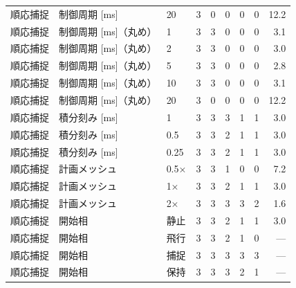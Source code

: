 \begin{tabular}{lllrrrrrr}
順応捕捉 & 制御周期 [ms] & 20 & 3 & 0 & 0 & 0 & 0 & 12.2 \\
順応捕捉 & 制御周期 [ms]（丸め） & 1 & 3 & 3 & 0 & 0 & 0 & 3.1 \\
順応捕捉 & 制御周期 [ms]（丸め） & 2 & 3 & 3 & 0 & 0 & 0 & 3.0 \\
順応捕捉 & 制御周期 [ms]（丸め） & 5 & 3 & 3 & 0 & 0 & 0 & 2.8 \\
順応捕捉 & 制御周期 [ms]（丸め） & 10 & 3 & 3 & 0 & 0 & 0 & 3.1 \\
順応捕捉 & 制御周期 [ms]（丸め） & 20 & 3 & 0 & 0 & 0 & 0 & 12.2 \\
順応捕捉 & 積分刻み [ms] & 1 & 3 & 3 & 3 & 1 & 1 & 3.0 \\
順応捕捉 & 積分刻み [ms] & 0.5 & 3 & 3 & 2 & 1 & 1 & 3.0 \\
順応捕捉 & 積分刻み [ms] & 0.25 & 3 & 3 & 2 & 1 & 1 & 3.0 \\
順応捕捉 & 計画メッシュ & 0.5× & 3 & 3 & 1 & 0 & 0 & 7.2 \\
順応捕捉 & 計画メッシュ & 1× & 3 & 3 & 2 & 1 & 1 & 3.0 \\
順応捕捉 & 計画メッシュ & 2× & 3 & 3 & 3 & 3 & 2 & 1.6 \\
順応捕捉 & 開始相 & 静止 & 3 & 3 & 2 & 1 & 1 & 3.0 \\
順応捕捉 & 開始相 & 飛行 & 3 & 3 & 2 & 1 & 0 & --- \\
順応捕捉 & 開始相 & 捕捉 & 3 & 3 & 3 & 3 & 3 & --- \\
順応捕捉 & 開始相 & 保持 & 3 & 3 & 3 & 2 & 1 & --- \\
\bottomrule
\end{tabular}
